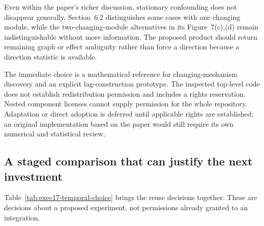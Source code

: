 Even within the paper's richer discussion, stationary confounding does not
disappear generally. Section~6.2 distinguishes some cases with one changing
module, while the two-changing-module alternatives in its Figure~7(c),(d)
remain indistinguishable without more information. The proposed product
should return remaining graph or effect ambiguity rather than force a
direction because a direction statistic is available.
\citep{exec17_temporal_cdnod_paper}

The immediate choice is a mathematical reference for changing-mechanism
discovery and an explicit lag-construction prototype. The inspected top-level
code does not establish redistribution permission and includes a rights
reservation. Nested component licenses cannot supply permission for the
whole repository. Adaptation or direct adoption is deferred until applicable
rights are established; an original implementation based on the paper would
still require its own numerical and statistical review.
\citep{exec17_temporal_cdnod,exec17_temporal_contract}

\subsection{A staged comparison that can justify the next investment}

Table~\ref{tab:exec17-temporal-choice} brings the reuse decisions together.
These are decisions about a proposed experiment, not permissions already
granted to an integration.

